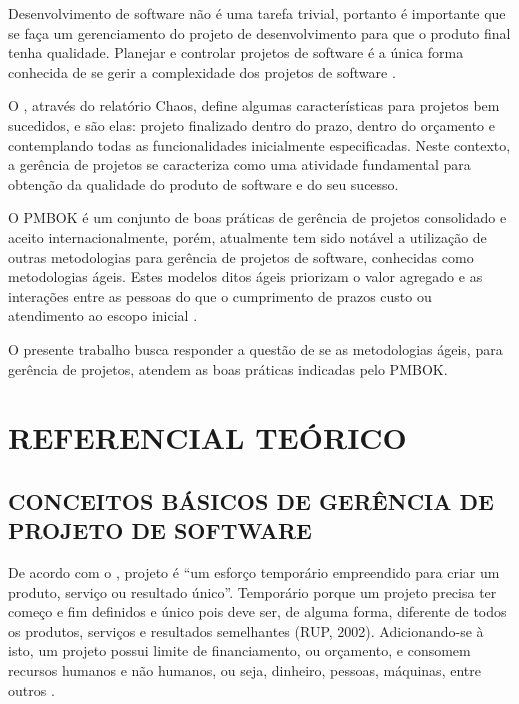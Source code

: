\documentclass[
    12pt,               %
    openright,          %
    twoside,            %
    a4paper,            %
    chapter=TITLE,     %
    english,            %
    spanish,            %
    portuguese              %
    ]{abntex2}
\begin{document}
Desenvolvimento de software não é uma tarefa trivial, portanto é importante que se faça um gerenciamento do projeto de desenvolvimento para que o produto final tenha qualidade. Planejar e controlar projetos de software é a única forma conhecida de se gerir a complexidade dos projetos de software \cite[p.~484]{pressman2006}.


O , através do relatório Chaos, define algumas características para projetos bem sucedidos, e são elas: projeto finalizado dentro do prazo, dentro do orçamento e contemplando todas as funcionalidades inicialmente especificadas. Neste contexto, a gerência de projetos se caracteriza como uma atividade fundamental para obtenção da qualidade do produto de software e do seu sucesso.


O PMBOK é um conjunto de boas práticas de gerência de projetos consolidado e aceito internacionalmente, porém, atualmente tem sido notável a utilização de outras metodologias para gerência de projetos de software, conhecidas como metodologias ágeis. Estes modelos ditos ágeis priorizam o valor agregado e as interações entre as pessoas do que o cumprimento de prazos custo ou atendimento ao escopo inicial \cite[p.~xxi]{prikladnickiAtAll}.


O presente trabalho busca responder a questão de se as metodologias ágeis, para gerência de projetos, atendem as boas práticas indicadas pelo PMBOK.



\chapter{REFERENCIAL TEÓRICO}

\section{CONCEITOS BÁSICOS DE GERÊNCIA DE PROJETO DE SOFTWARE}

De acordo com o , projeto é \textquotedblleft{}um esforço temporário empreendido para criar um produto, serviço ou resultado único\textquotedblright{}. Temporário porque um projeto precisa ter começo e fim definidos e único pois deve ser, de alguma forma, diferente de todos os produtos, serviços e resultados semelhantes (RUP, 2002). Adicionando-se à isto, um projeto possui limite de financiamento, ou orçamento, e consomem recursos humanos e não humanos, ou seja, dinheiro, pessoas, máquinas, entre outros \cite[p.~2]{kerzner2011}.
\end{document}
